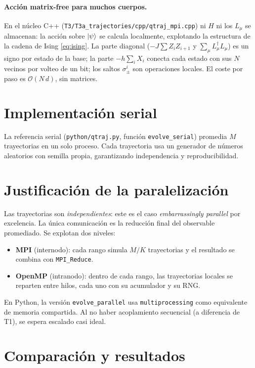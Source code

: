\paragraph{Acción matrix-free para muchos cuerpos.}
En el núcleo C++ (\texttt{T3/T3a\_trajectories/cpp/qtraj\_mpi.cpp}) ni $H$ ni los
$L_\mu$ se almacenan: la acción sobre $\ket{\psi}$ se calcula localmente,
explotando la estructura de la cadena de Ising \cref{eq:ising}. La parte diagonal
($-J\sum Z_iZ_{i+1}$ y $\sum_\mu L_\mu^\dagger L_\mu$) es un signo por estado de la
base; la parte $-h\sum_i X_i$ conecta cada estado con sus $N$ vecinos por
volteo de un bit; los saltos $\sigma_\pm^i$ son operaciones locales. El coste por
paso es $\mathcal{O}(N\,d)$, sin matrices.

\section{Implementación serial}

La referencia serial (\texttt{python/qtraj.py}, función \texttt{evolve\_serial})
promedia $M$ trayectorias en un solo proceso. Cada trayectoria usa un generador
de números aleatorios con semilla propia, garantizando independencia y
reproducibilidad.

\section{Justificación de la paralelización}

Las trayectorias son \emph{independientes}: este es el caso \emph{embarrassingly
parallel} por excelencia. La única comunicación es la reducción final del
observable promediado. Se explotan dos niveles:
\begin{itemize}
  \item \textbf{MPI} (internodo): cada rango simula $M/K$ trayectorias y el
  resultado se combina con \texttt{MPI\_Reduce}.
  \item \textbf{OpenMP} (intranodo): dentro de cada rango, las trayectorias
  locales se reparten entre hilos, cada uno con su acumulador y su RNG.
\end{itemize}
En Python, la versión \texttt{evolve\_parallel} usa \texttt{multiprocessing} como
equivalente de memoria compartida. Al no haber acoplamiento secuencial (a
diferencia de T1), se espera escalado casi ideal.

\section{Comparación y resultados}

